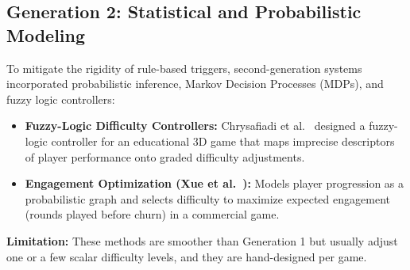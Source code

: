 \subsection{Generation 2: Statistical and Probabilistic Modeling}
To mitigate the rigidity of rule-based triggers, second-generation systems incorporated probabilistic inference, Markov Decision Processes (MDPs), and fuzzy logic controllers:
\begin{itemize}
    \item \textbf{Fuzzy-Logic Difficulty Controllers:} Chrysafiadi et al.~\cite{chrysafiadi2023fuzzy} designed a fuzzy-logic controller for an educational 3D game that maps imprecise descriptors of player performance onto graded difficulty adjustments.
    \item \textbf{Engagement Optimization (Xue et al.~\cite{xue2017dynamic}):} Models player progression as a probabilistic graph and selects difficulty to maximize expected engagement (rounds played before churn) in a commercial game.
\end{itemize}
\textbf{Limitation:} These methods are smoother than Generation 1 but usually adjust one or a few scalar difficulty levels, and they are hand-designed per game.


